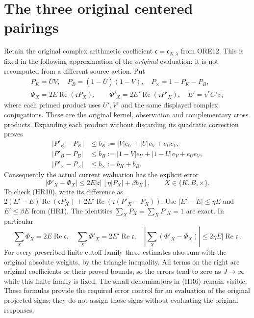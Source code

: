 \documentclass[11pt]{article}
\begin{document}
\section{The three original centered pairings}
Retain the original complex arithmetic coefficient
$\mathfrak c=\mathfrak c_{N,\lambda}$ from ORE12. This is fixed
in the following approximation of the \emph{original} evaluation;
it is not recomputed from a different source action. Put
\begin{equation}\tag{HR8}
 \begin{gathered}
 P_K=\overline U V,\quad
 P_B=(1-\overline U)(1-V),\quad
 P_\times=1-P_K-P_B,\\
 \Phi_X=2E\operatorname{Re}(\mathfrak cP_X),\qquad
 \Phi'_X=2E'\operatorname{Re}(\mathfrak cP'_X),\quad
 E'=v^*G'v,
 \end{gathered}
\end{equation}
where each primed product uses $U',V'$ and the same displayed
complex conjugations. These are the original kernel, observation
and complementary cross products. Expanding each product without
discarding its quadratic correction proves
\begin{equation}\tag{HR9}
 \begin{aligned}
 |P'_K-P_K|&\le b_K:=|V|e_U+|U|e_V+e_Ue_V,\\
 |P'_B-P_B|&\le b_B:=|1-V|e_U+|1-U|e_V+e_Ue_V,\\
 |P'_\times-P_\times|&\le b_\times:=b_K+b_B.
 \end{aligned}
\end{equation}
Consequently the actual current evaluation has the explicit error
\begin{equation}\tag{HR10}
 |\Phi'_X-\Phi_X|
 \le 2E|\mathfrak c|\,[\eta|P_X|+\beta b_X],
 \qquad X\in\{K,B,\times\}.
\end{equation}
To check (HR10), write its difference as
$2(E'-E)\operatorname{Re}(\mathfrak cP_X)
 +2E'\operatorname{Re}(\mathfrak c(P'_X-P_X))$.
Use $|E'-E|\le\eta E$ and $E'\le\beta E$ from (HR1).
The identities $\sum_XP_X=\sum_XP'_X=1$ are exact. In particular
\begin{equation}\tag{HR11}
 \sum_X\Phi_X=2E\operatorname{Re}\mathfrak c,\quad
 \sum_X\Phi'_X=2E'\operatorname{Re}\mathfrak c,\quad
 \left|\sum_X(\Phi'_X-\Phi_X)\right|
 \le2\eta E|\operatorname{Re}\mathfrak c|.
\end{equation}
For every prescribed finite cutoff family these estimates also sum
with the original absolute weights, by the triangle inequality.
All terms on the right are original coefficients or their proved
bounds, so the errors tend to zero as $J\to\infty$ while this finite
family is fixed. The small denominators in (HR6) remain visible.
These formulas provide the required error control for an evaluation
of the original projected signs; they do not assign those signs
without evaluating the original responses.
\end{document}
